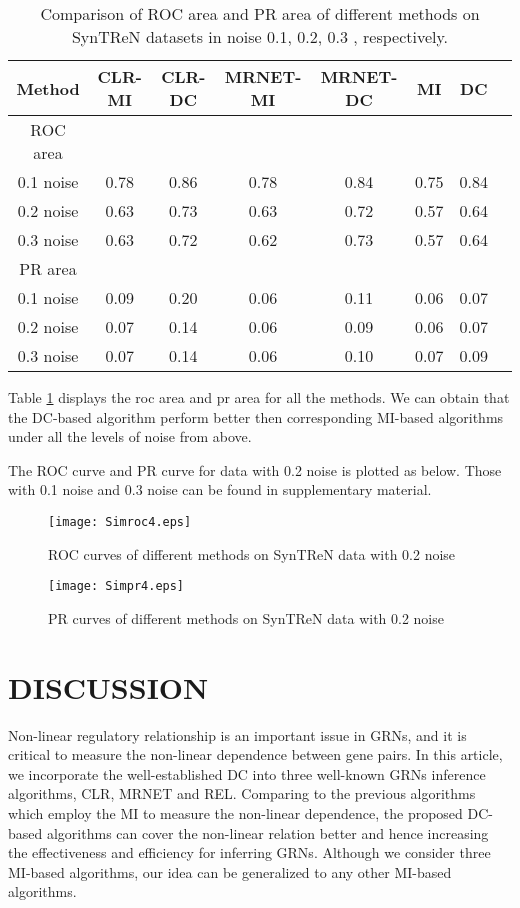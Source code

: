 \documentclass{bioinfo}
\begin{document}
\begin{table}[0.5\textwidth] \tiny
\centering \caption{Comparison of ROC area and PR area of different
methods on SynTReN datasets in noise 0.1, 0.2, 0.3 ,
respectively.}\label{noisy-roc-pr}
\begin{tabular}{cccccccc}
 \hline
 Method & CLR-MI & CLR-DC & MRNET-MI & MRNET-DC & MI & DC \\
 \hline
  ROC area\\
 0.1 noise & 0.78 & 0.86 & 0.78 & 0.84 & 0.75 & 0.84  \\
 0.2 noise & 0.63 & 0.73 & 0.63 & 0.72 & 0.57 & 0.64 \\
 0.3 noise & 0.63 & 0.72 & 0.62 & 0.73 & 0.57 & 0.64 \\
 PR area\\
 0.1 noise & 0.09 & 0.20 & 0.06 & 0.11 & 0.06 & 0.07  \\
 0.2 noise & 0.07 & 0.14 & 0.06 & 0.09 & 0.06 & 0.07  \\
 0.3 noise & 0.07 & 0.14 & 0.06 & 0.10 & 0.07 & 0.09 \\
  \hline
\end{tabular}
\end{table}

 Table \ref{noisy-roc-pr} displays the roc area and pr area for all
 the methods. We can obtain that the DC-based algorithm perform
 better then corresponding MI-based algorithms under all the levels
 of noise from above.

   The ROC curve and PR curve for data with 0.2 noise is plotted as
 below. Those with 0.1 noise and 0.3 noise can be found in
 supplementary material.
 \begin{figure}[!h]
  \texttt{[image: Simroc4.eps]}
  \caption{ROC curves of different methods on SynTReN data with 0.2 noise}\label{noisy-roc-sos}
\end{figure}

\begin{figure}[!h]
  \texttt{[image: Simpr4.eps]}
  \caption{PR curves of different methods on SynTReN data with 0.2 noise}\label{noisy-pr-sos}
\end{figure}



\section{DISCUSSION}

Non-linear regulatory relationship is an important issue in GRNs, and it is critical to measure the non-linear dependence between gene pairs. In this article,
we incorporate the well-established DC into three well-known GRNs inference algorithms, CLR, MRNET and REL. Comparing to the previous algorithms which employ the MI to measure the non-linear dependence, the proposed DC-based algorithms can cover the non-linear relation better and hence increasing the effectiveness and efficiency for inferring GRNs. Although we consider three MI-based algorithms, our idea can be generalized to any other MI-based algorithms.
\end{document}
